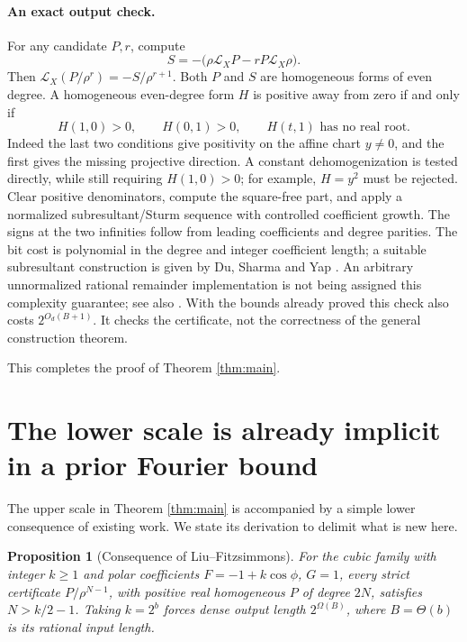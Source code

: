 \documentclass[11pt]{article}
\newtheorem{proposition}[theorem]{Proposition}
\theoremstyle{remark}\newtheorem{remark}[theorem]{Remark}
\newcommand{\LX}{\mathcal L_X}
\newcommand{\se}{2^{O_d(B+1)}}
\begin{document}
\paragraph{An exact output check.}
For any candidate \(P,r\), compute
\[
 S=-\bigl(\rho\LX P-rP\LX\rho\bigr).
\]
Then \(\LX(P/\rho^r)=-S/\rho^{r+1}\). Both \(P\) and \(S\) are homogeneous forms of even degree.
A homogeneous even-degree form \(H\) is positive away from zero if and only if
\[
 H(1,0)>0,\qquad H(0,1)>0,\qquad H(t,1)\text{ has no real root}.
\]
Indeed the last two conditions give positivity on the affine chart \(y\ne0\), and the first gives the missing projective direction. A constant dehomogenization is tested directly, while still requiring \(H(1,0)>0\); for example, \(H=y^2\) must be rejected. Clear positive denominators, compute the square-free part, and apply a normalized subresultant/Sturm sequence with controlled coefficient growth. The signs at the two infinities follow from leading coefficients and degree parities. The bit cost is polynomial in the degree and integer coefficient length; a suitable subresultant construction is given by Du, Sharma and Yap \cite[Theorem 2(i)]{DSY}. An arbitrary unnormalized rational remainder implementation is not being assigned this complexity guarantee; see also \cite{BPR}. With the bounds already proved this check also costs \(\se\). It checks the certificate, not the correctness of the general construction theorem.

This completes the proof of Theorem \ref{thm:main}.

\section{The lower scale is already implicit in a prior Fourier bound}\label{sec:lower}

The upper scale in Theorem \ref{thm:main} is accompanied by a simple lower consequence of existing work. We state its derivation to delimit what is new here.

\begin{proposition}[Consequence of Liu--Fitzsimmons]\label{prop:priorlower}
For the cubic family with integer \(k\geq1\) and polar coefficients \(F=-1+k\cos\phi\), \(G=1\), every strict certificate \(P/\rho^{N-1}\), with positive real homogeneous \(P\) of degree \(2N\), satisfies \(N>k/2-1\). Taking \(k=2^b\) forces dense output length \(2^{\Omega(B)}\), where \(B=\Theta(b)\) is its rational input length.
\end{proposition}
\end{document}
